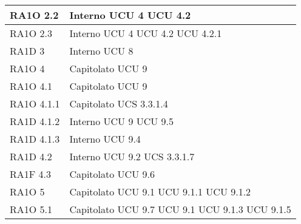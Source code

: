 \begin{center}
\begin{longtable}{ | p{5cm} | p{5cm} |}
				RA1O 2.2 &  Interno \newline  UCU 4 \newline  UCU 4.2 \newline  \\ \hline      
				RA1O 2.3 &  Interno \newline  UCU 4 \newline  UCU 4.2 \newline  UCU 4.2.1 \newline  \\ \hline      
				RA1D 3 &  Interno \newline  UCU 8 \newline  \\ \hline      
				RA1O 4 &  Capitolato \newline  UCU 9 \newline  \\ \hline      
				RA1O 4.1 &  Capitolato \newline  UCU 9 \newline  \\ \hline      
				RA1O 4.1.1 &  Capitolato \newline  UCS 3.3.1.4 \newline  \\ \hline      
				RA1D 4.1.2 &  Interno \newline  UCU 9 \newline  UCU 9.5 \newline  \\ \hline      
				RA1D 4.1.3 &  Interno \newline  UCU 9.4 \newline  \\ \hline      
				RA1D 4.2 &  Interno \newline  UCU 9.2 \newline  UCS 3.3.1.7 \newline  \\ \hline      
				RA1F 4.3 &  Capitolato \newline  UCU 9.6 \newline  \\ \hline      
				RA1O 5 &  Capitolato \newline  UCU 9.1 \newline  UCU 9.1.1 \newline  UCU 9.1.2 \newline  \\ \hline      
				RA1O 5.1 &  Capitolato \newline  UCU 9.7 \newline  UCU 9.1 \newline  UCU 9.1.3 \newline  UCU 9.1.5 \newline  \\ \hline      

\end{longtable}
\end{center}

